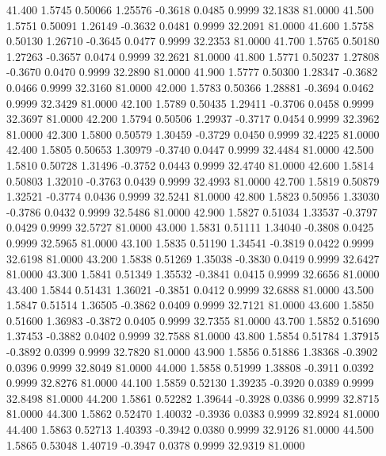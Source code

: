   41.400   1.5745   0.50066   1.25576  -0.3618   0.0485   0.9999  32.1838  81.0000
  41.500   1.5751   0.50091   1.26149  -0.3632   0.0481   0.9999  32.2091  81.0000
  41.600   1.5758   0.50130   1.26710  -0.3645   0.0477   0.9999  32.2353  81.0000
  41.700   1.5765   0.50180   1.27263  -0.3657   0.0474   0.9999  32.2621  81.0000
  41.800   1.5771   0.50237   1.27808  -0.3670   0.0470   0.9999  32.2890  81.0000
  41.900   1.5777   0.50300   1.28347  -0.3682   0.0466   0.9999  32.3160  81.0000
  42.000   1.5783   0.50366   1.28881  -0.3694   0.0462   0.9999  32.3429  81.0000
  42.100   1.5789   0.50435   1.29411  -0.3706   0.0458   0.9999  32.3697  81.0000
  42.200   1.5794   0.50506   1.29937  -0.3717   0.0454   0.9999  32.3962  81.0000
  42.300   1.5800   0.50579   1.30459  -0.3729   0.0450   0.9999  32.4225  81.0000
  42.400   1.5805   0.50653   1.30979  -0.3740   0.0447   0.9999  32.4484  81.0000
  42.500   1.5810   0.50728   1.31496  -0.3752   0.0443   0.9999  32.4740  81.0000
  42.600   1.5814   0.50803   1.32010  -0.3763   0.0439   0.9999  32.4993  81.0000
  42.700   1.5819   0.50879   1.32521  -0.3774   0.0436   0.9999  32.5241  81.0000
  42.800   1.5823   0.50956   1.33030  -0.3786   0.0432   0.9999  32.5486  81.0000
  42.900   1.5827   0.51034   1.33537  -0.3797   0.0429   0.9999  32.5727  81.0000
  43.000   1.5831   0.51111   1.34040  -0.3808   0.0425   0.9999  32.5965  81.0000
  43.100   1.5835   0.51190   1.34541  -0.3819   0.0422   0.9999  32.6198  81.0000
  43.200   1.5838   0.51269   1.35038  -0.3830   0.0419   0.9999  32.6427  81.0000
  43.300   1.5841   0.51349   1.35532  -0.3841   0.0415   0.9999  32.6656  81.0000
  43.400   1.5844   0.51431   1.36021  -0.3851   0.0412   0.9999  32.6888  81.0000
  43.500   1.5847   0.51514   1.36505  -0.3862   0.0409   0.9999  32.7121  81.0000
  43.600   1.5850   0.51600   1.36983  -0.3872   0.0405   0.9999  32.7355  81.0000
  43.700   1.5852   0.51690   1.37453  -0.3882   0.0402   0.9999  32.7588  81.0000
  43.800   1.5854   0.51784   1.37915  -0.3892   0.0399   0.9999  32.7820  81.0000
  43.900   1.5856   0.51886   1.38368  -0.3902   0.0396   0.9999  32.8049  81.0000
  44.000   1.5858   0.51999   1.38808  -0.3911   0.0392   0.9999  32.8276  81.0000
  44.100   1.5859   0.52130   1.39235  -0.3920   0.0389   0.9999  32.8498  81.0000
  44.200   1.5861   0.52282   1.39644  -0.3928   0.0386   0.9999  32.8715  81.0000
  44.300   1.5862   0.52470   1.40032  -0.3936   0.0383   0.9999  32.8924  81.0000
  44.400   1.5863   0.52713   1.40393  -0.3942   0.0380   0.9999  32.9126  81.0000
  44.500   1.5865   0.53048   1.40719  -0.3947   0.0378   0.9999  32.9319  81.0000
